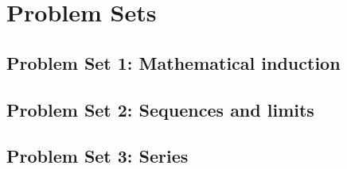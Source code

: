 \documentclass[es]{lecturenotes}
\date{20/21 S1}
\begin{document}
    \pagestyle{plain}
    \lntitlepage
    \clearpage
    \tableofcontents
    \newpage

    
    
    
    

    \appendix
    \chapter{Problem Sets}
        \section{Problem Set 1: Mathematical induction}
        \section{Problem Set 2: Sequences and limits}
        \section{Problem Set 3: Series}

    \clearpage
    \listoftheorems

    \nocite{*}
    
\end{document}
